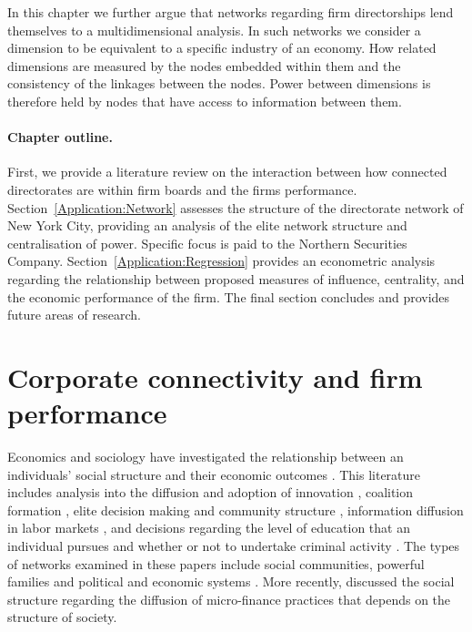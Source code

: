 In this chapter we further argue that networks regarding firm directorships lend themselves to a multidimensional analysis. In such networks we consider a dimension to be equivalent to a specific industry of an economy. How related dimensions are measured by the nodes embedded within them and the consistency of the linkages between the nodes. Power between dimensions is therefore held by nodes that have access to information between them.

\paragraph{Chapter outline.}

First, we provide a literature review on the interaction between how connected directorates are within firm boards and the firms performance. Section~\ref{Application:Network} assesses the structure of the directorate network of New York City, providing an analysis of the elite network structure and centralisation of power. Specific focus is paid to the Northern Securities Company. Section~\ref{Application:Regression} provides an econometric analysis regarding the relationship between proposed measures of influence, centrality, and the economic performance of the firm. The final section concludes and provides future areas of research.

\section{Corporate connectivity and firm performance} 
\label{Literature}

Economics and sociology have investigated the relationship between an individuals' social structure and their economic outcomes \citep{Granovetter1985}. This literature includes analysis into the diffusion and adoption of innovation \citep{Coleman1966}, coalition formation \citep{Kapferer1969}, elite decision making and community structure \citep{LaumannGalaskiewiczMarsden1978}, information diffusion in labor markets \citep{Granovetter1973}, and decisions regarding the level of education that an individual pursues and whether or not to undertake criminal activity \citep{BallesterZenou2006, Jackson2007}. The types of networks examined in these papers include social communities, powerful families and political and economic systems \citep{Padgett1993, Padgett1994}. More recently, \citet{Banerjee2013} discussed the social structure regarding the diffusion of micro-finance practices that depends on the structure of society.

